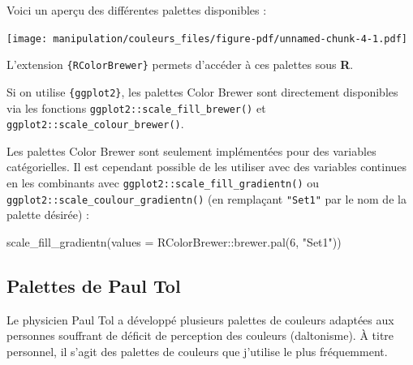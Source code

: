 \documentclass[
  letterpaper,
  DIV=11,
  numbers=noendperiod,
  oneside]{scrreprt}
\newenvironment{Shaded}{\begin{snugshade}}{\end{snugshade}}
\newcommand{\AttributeTok}[1]{\textcolor[rgb]{0.40,0.45,0.13}{#1}}
\newcommand{\DecValTok}[1]{\textcolor[rgb]{0.68,0.00,0.00}{#1}}
\newcommand{\FunctionTok}[1]{\textcolor[rgb]{0.28,0.35,0.67}{#1}}
\newcommand{\NormalTok}[1]{\textcolor[rgb]{0.00,0.23,0.31}{#1}}
\newcommand{\SpecialCharTok}[1]{\textcolor[rgb]{0.37,0.37,0.37}{#1}}
\newcommand{\StringTok}[1]{\textcolor[rgb]{0.13,0.47,0.30}{#1}}
\begin{document}
Voici un aperçu des différentes palettes disponibles :

\texttt{[image: manipulation/couleurs\_files/figure-pdf/unnamed-chunk-4-1.pdf]}

L'extension \texttt{\{RColorBrewer\}} permets d'accéder à ces palettes
sous \textbf{R}.

Si on utilise \texttt{\{ggplot2\}}, les palettes Color Brewer sont
directement disponibles via les fonctions
\texttt{ggplot2::scale\_fill\_brewer()} et
\texttt{ggplot2::scale\_colour\_brewer()}.

\begin{tcolorbox}[enhanced jigsaw, colbacktitle=quarto-callout-caution-color!10!white, opacityback=0, toprule=.15mm, colback=white, coltitle=black, bottomtitle=1mm, toptitle=1mm, titlerule=0mm, rightrule=.15mm, title=\textcolor{quarto-callout-caution-color}{\faFire}\hspace{0.5em}{Mise en garde}, breakable, bottomrule=.15mm, opacitybacktitle=0.6, arc=.35mm, left=2mm, leftrule=.75mm, colframe=quarto-callout-caution-color-frame]

Les palettes Color Brewer sont seulement implémentées pour des variables
catégorielles. Il est cependant possible de les utiliser avec des
variables continues en les combinants avec
\texttt{ggplot2::scale\_fill\_gradientn()} ou
\texttt{ggplot2::scale\_coulour\_gradientn()} (en remplaçant
\texttt{"Set1"} par le nom de la palette désirée) :

\begin{Shaded}
\begin{Highlighting}[]
\FunctionTok{scale\_fill\_gradientn}\NormalTok{(}\AttributeTok{values =}\NormalTok{ RColorBrewer}\SpecialCharTok{::}\FunctionTok{brewer.pal}\NormalTok{(}\DecValTok{6}\NormalTok{, }\StringTok{"Set1"}\NormalTok{))}
\end{Highlighting}
\end{Shaded}

\end{tcolorbox}

\hypertarget{palettes-de-paul-tol}{%
\subsection{Palettes de Paul Tol}\label{palettes-de-paul-tol}}

Le physicien Paul Tol a développé plusieurs palettes de couleurs
adaptées aux personnes souffrant de déficit de perception des couleurs
(daltonisme). À titre personnel, il s'agit des palettes de couleurs que
j'utilise le plus fréquemment.
\end{document}
